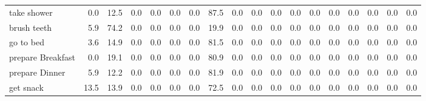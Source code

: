 \documentclass{article}
\begin{document}
\begin{sideways}
\begin{tabular}{lrrrrrrrrrrrrrrrrr}
take shower                   &         0.0 &               12.5 &           0.0 &               0.0 &                0.0 &                0.0 &             87.5 &                      0.0 &                   0.0 &              0.0 &              0.0 &                            0.0 &                      0.0 &                    0.0 &                                  0.0 &                          0.0 &                  0.0 \\
brush teeth                   &         5.9 &               74.2 &           0.0 &               0.0 &                0.0 &                0.0 &             19.9 &                      0.0 &                   0.0 &              0.0 &              0.0 &                            0.0 &                      0.0 &                    0.0 &                                  0.0 &                          0.0 &                  0.0 \\
go to bed                     &         3.6 &               14.9 &           0.0 &               0.0 &                0.0 &                0.0 &             81.5 &                      0.0 &                   0.0 &              0.0 &              0.0 &                            0.0 &                      0.0 &                    0.0 &                                  0.0 &                          0.0 &                  0.0 \\
prepare Breakfast             &         0.0 &               19.1 &           0.0 &               0.0 &                0.0 &                0.0 &             80.9 &                      0.0 &                   0.0 &              0.0 &              0.0 &                            0.0 &                      0.0 &                    0.0 &                                  0.0 &                          0.0 &                  0.0 \\
prepare Dinner                &         5.9 &               12.2 &           0.0 &               0.0 &                0.0 &                0.0 &             81.9 &                      0.0 &                   0.0 &              0.0 &              0.0 &                            0.0 &                      0.0 &                    0.0 &                                  0.0 &                          0.0 &                  0.0 \\
get snack                     &        13.5 &               13.9 &           0.0 &               0.0 &                0.0 &                0.0 &             72.5 &                      0.0 &                   0.0 &              0.0 &              0.0 &                            0.0 &                      0.0 &                    0.0 &                                  0.0 &                          0.0 &                  0.0 \\

\end{tabular}
\end{sideways}
\end{document}
